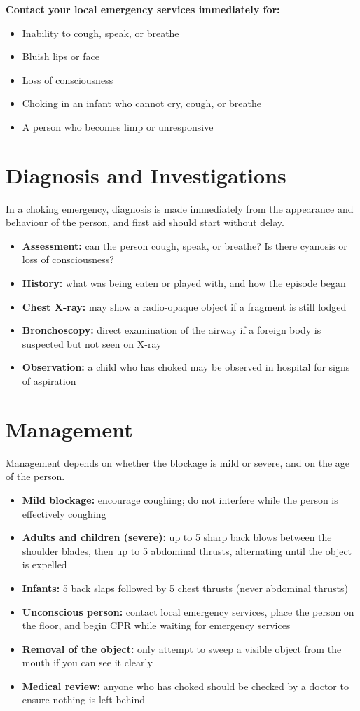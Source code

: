 \textbf{Contact your local emergency services immediately for:}
\begin{itemize}
    \item Inability to cough, speak, or breathe
    \item Bluish lips or face
    \item Loss of consciousness
    \item Choking in an infant who cannot cry, cough, or breathe
    \item A person who becomes limp or unresponsive
\end{itemize}

\section*{Diagnosis and Investigations}
In a choking emergency, diagnosis is made immediately from the appearance and behaviour of the person, and first aid should start without delay.

\begin{itemize}
    \item \textbf{Assessment:} can the person cough, speak, or breathe? Is there cyanosis or loss of consciousness?
    \item \textbf{History:} what was being eaten or played with, and how the episode began
    \item \textbf{Chest X-ray:} may show a radio-opaque object if a fragment is still lodged
    \item \textbf{Bronchoscopy:} direct examination of the airway if a foreign body is suspected but not seen on X-ray
    \item \textbf{Observation:} a child who has choked may be observed in hospital for signs of aspiration
\end{itemize}

\section*{Management}
Management depends on whether the blockage is mild or severe, and on the age of the person.

\begin{itemize}
    \item \textbf{Mild blockage:} encourage coughing; do not interfere while the person is effectively coughing
    \item \textbf{Adults and children (severe):} up to 5 sharp back blows between the shoulder blades, then up to 5 abdominal thrusts, alternating until the object is expelled
    \item \textbf{Infants:} 5 back slaps followed by 5 chest thrusts (never abdominal thrusts)
    \item \textbf{Unconscious person:} contact local emergency services, place the person on the floor, and begin CPR while waiting for emergency services
    \item \textbf{Removal of the object:} only attempt to sweep a visible object from the mouth if you can see it clearly
    \item \textbf{Medical review:} anyone who has choked should be checked by a doctor to ensure nothing is left behind
\end{itemize}

